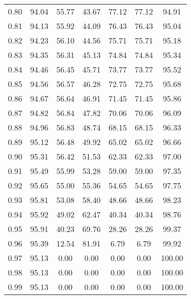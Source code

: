 \begin{tabular}{|c|c|c|c|c|c|c|}
      0.80 &     94.04 &     55.77 &      43.67 &   77.12 &      77.12 &         94.91 \\
      0.81 &     94.13 &     55.92 &      44.09 &   76.43 &      76.43 &         95.04 \\
      0.82 &     94.23 &     56.10 &      44.56 &   75.71 &      75.71 &         95.18 \\
      0.83 &     94.35 &     56.31 &      45.13 &   74.84 &      74.84 &         95.34 \\
      0.84 &     94.46 &     56.45 &      45.71 &   73.77 &      73.77 &         95.52 \\
      0.85 &     94.56 &     56.57 &      46.28 &   72.75 &      72.75 &         95.68 \\
      0.86 &     94.67 &     56.64 &      46.91 &   71.45 &      71.45 &         95.86 \\
      0.87 &     94.82 &     56.84 &      47.82 &   70.06 &      70.06 &         96.09 \\
      0.88 &     94.96 &     56.83 &      48.74 &   68.15 &      68.15 &         96.33 \\
      0.89 &     95.12 &     56.48 &      49.92 &   65.02 &      65.02 &         96.66 \\
      0.90 &     95.31 &     56.42 &      51.53 &   62.33 &      62.33 &         97.00 \\
      0.91 &     95.49 &     55.99 &      53.28 &   59.00 &      59.00 &         97.35 \\
      0.92 &     95.65 &     55.00 &      55.36 &   54.65 &      54.65 &         97.75 \\
      0.93 &     95.81 &     53.08 &      58.40 &   48.66 &      48.66 &         98.23 \\
      0.94 &     95.92 &     49.02 &      62.47 &   40.34 &      40.34 &         98.76 \\
      0.95 &     95.91 &     40.23 &      69.76 &   28.26 &      28.26 &         99.37 \\
      0.96 &     95.39 &     12.54 &      81.91 &    6.79 &       6.79 &         99.92 \\
      0.97 &     95.13 &      0.00 &       0.00 &    0.00 &       0.00 &        100.00 \\
      0.98 &     95.13 &      0.00 &       0.00 &    0.00 &       0.00 &        100.00 \\
      0.99 &     95.13 &      0.00 &       0.00 &    0.00 &       0.00 &        100.00 \\
\bottomrule
\end{tabular}

